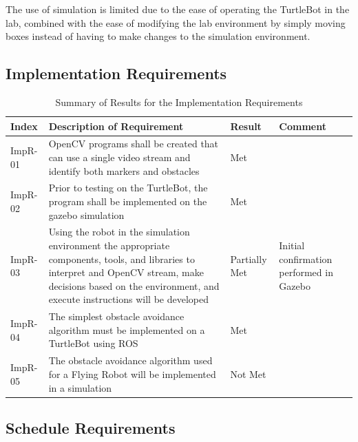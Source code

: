 \documentclass{article}[12]
\begin{document}
The use of simulation is limited due to the ease of operating the TurtleBot in the lab, combined with the ease of modifying the lab environment by simply moving boxes instead of having to make changes to the simulation environment.

 \subsection{Implementation Requirements}
 
	\begin{table}[H]
  \small
		\begin{tabular}{p{2cm} p{8cm} p{2cm} p{3cm}}
			\hline
			{\textbf{Index}} & {\textbf{Description of Requirement}} & {\textbf{Result}} & {\textbf{Comment}} \\ \hline 
ImpR-01 & OpenCV programs shall be created that can use a single video stream and identify both markers and obstacles & Met & \\ 
ImpR-02 & Prior to testing on the TurtleBot, the program shall be implemented on the gazebo simulation & Met & \\
ImpR-03 & Using the robot in the simulation environment the appropriate components, tools, and libraries to interpret and OpenCV stream, make decisions based on the environment, and execute instructions will be developed & Partially Met & Initial confirmation performed in Gazebo \\
ImpR-04 & The simplest obstacle avoidance algorithm must be implemented on a TurtleBot using ROS & Met & \\
ImpR-05 & The obstacle avoidance algorithm used for a Flying Robot will be implemented in a simulation & Not Met & \\ \hline
		\end{tabular}
		\caption{Summary of Results for the Implementation Requirements}
		\label{table:impresults}
 \end{table}

 
 \subsection{Schedule Requirements}
\end{document}
